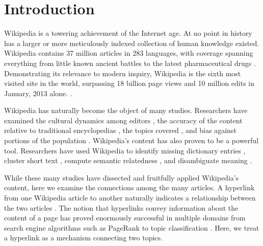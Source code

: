 \documentclass[pre,twocolumn,twoside,superscriptaddress,floatfix, aps, 10pt]{revtex4-1}
\begin{document}
\maketitle

\section{Introduction}

Wikipedia is a towering achievement of the Internet age. 
At no point in history has a larger or more meticulously indexed collection of human knowledge 
existed.
Wikipedia contains 37 million articles in 283 languages, 
with coverage spanning everything from little known ancient battles to the latest pharmaceutical drugs 
\cite{clauson2008scope, stats}.
Demonstrating its relevance to modern inquiry,
Wikipedia is the sixth most visited
site in the world, surpassing 18 billion page views and 10 million edits in January, 2013 alone.
\cite{wiki_edits, wiki_views}.

Wikipedia has naturally become the object of many studies. 
Researchers have examined the cultural dynamics among editors
\cite{iba2010analyzing, samoilenko2016linguistic},
the accuracy of the content relative to traditional encyclopedias
\cite{holman2008comparison, giles2005internet},
the topics covered 
\cite{halavais2008analysis},
and bias against portions of the population
\cite{hill2013wikipedia}.
Wikipedia's content has also proven to be a powerful tool. 
Researchers have used Wikipedia to identify missing dictionary entries
\cite{williams2015identifying},
cluster short text
\cite{banerjee2007clustering},
compute semantic relatedness
\cite{gabrilovich2007computing},
and disambiguate meaning \cite{cucerzan2007large}.

While these many studies have dissected and fruitfully applied Wikipedia's content,
here we examine the connections among the many articles.
A hyperlink from one Wikipedia article to another
naturally indicates a relationship between the two articles
\cite{kamps2009wikipedia}.
The notion that hyperlinks convey information about the content of a
page has proved enormously successful in multiple domains from search engine algorithms 
such as PageRank 
\cite{page1999pagerank} 
to topic classification
\cite{chakrabarti2001integrating}.
Here, we treat a hyperlink as a mechanism connecting two topics.
\end{document}
